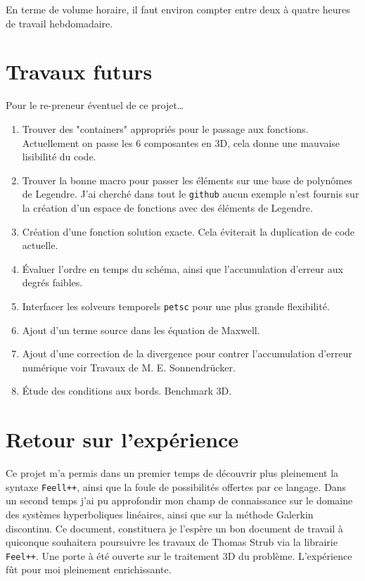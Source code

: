 \documentclass[a4paper,oneside,10pt]{report}
\begin{document}
En terme de volume horaire, il faut environ compter entre deux à quatre heures de travail hebdomadaire.



\section{Travaux futurs}
Pour le re-preneur éventuel de ce projet\dots
\begin{enumerate}
\item Trouver des "containers" appropriés pour le passage aux fonctions. Actuellement on passe les 6 composantes en 3D, cela donne une mauvaise lisibilité du code.
\item Trouver la bonne macro pour passer les éléments sur une base de polynômes de Legendre. J'ai cherché dans tout le \texttt{github} aucun exemple n'est fournis sur la création d'un espace de fonctions avec des éléments de Legendre.
\item Création d'une fonction solution exacte. Cela éviterait la duplication de code actuelle.
\item Évaluer l'ordre en temps du schéma, ainsi que l'accumulation d'erreur aux degrés faibles.
\item Interfacer les solveurs temporels \texttt{petsc} pour une plus grande flexibilité.
\item Ajout d'un terme source dans les équation de Maxwell.
\item Ajout d'une correction de la divergence pour contrer l'accumulation d'erreur numérique voir Travaux de M. E. Sonnendrücker.
\item Étude des conditions aux bords. Benchmark 3D.
\end{enumerate}

\section{Retour sur l'expérience}
Ce projet m'a permis dans un premier temps de découvrir plus pleinement la syntaxe \texttt{Feell++}, ainsi que la foule de possibilités offertes par ce langage. Dans un second temps j'ai pu approfondir mon champ de connaissance sur le domaine des systèmes hyperboliques linéaires, ainsi que sur la méthode Galerkin discontinu. Ce document, constituera je l'espère un bon document de travail à quiconque souhaitera poursuivre les travaux de Thomas Strub via la librairie \texttt{Feel++}. Une porte à été ouverte sur le traitement 3D du problème. L'expérience fût pour moi pleinement enrichissante.
\end{document}
